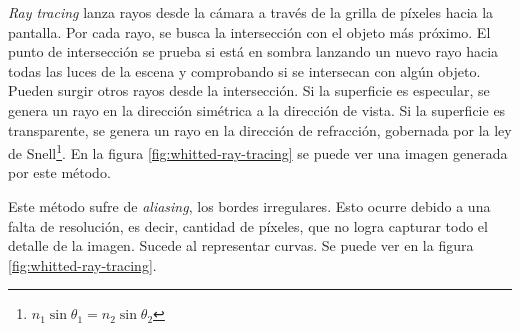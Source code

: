 \textit{Ray tracing} lanza rayos desde la cámara a través de la grilla de píxeles hacia la pantalla.
Por cada rayo, se busca la intersección con el objeto más próximo.
El punto de intersección se prueba si está en sombra lanzando un nuevo rayo hacia todas las luces de la escena y comprobando si se intersecan con algún objeto.
Pueden surgir otros rayos desde la intersección.
Si la superficie es especular, se genera un rayo en la dirección simétrica a la dirección de vista.
Si la superficie es transparente, se genera un rayo en la dirección de refracción, gobernada por la ley de Snell\footnote{$n_1 \sin{\theta_1} = n_2 \sin{\theta_2}$}.
En la figura \ref{fig:whitted-ray-tracing} se puede ver una imagen generada por este método.

Este método sufre de \textit{aliasing}, los bordes irregulares.
Esto ocurre debido a una falta de resolución, es decir, cantidad de píxeles, que no logra capturar todo el detalle de la imagen.
Sucede al representar curvas.
Se puede ver en la figura \ref{fig:whitted-ray-tracing}.


